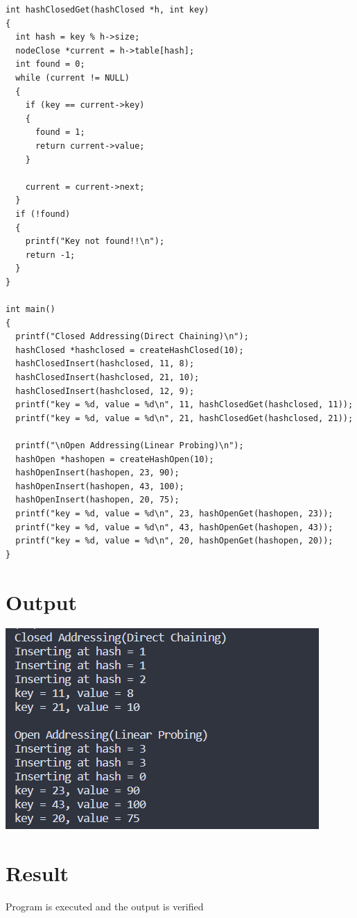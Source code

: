 \begin{lstlisting}[label={list:c_program:polynomial_operations}]
int hashClosedGet(hashClosed *h, int key)
{
  int hash = key % h->size;
  nodeClose *current = h->table[hash];
  int found = 0;
  while (current != NULL)
  {
    if (key == current->key)
    {
      found = 1;
      return current->value;
    }

    current = current->next;
  }
  if (!found)
  {
    printf("Key not found!!\n");
    return -1;
  }
}

int main()
{
  printf("Closed Addressing(Direct Chaining)\n");
  hashClosed *hashclosed = createHashClosed(10);
  hashClosedInsert(hashclosed, 11, 8);
  hashClosedInsert(hashclosed, 21, 10);
  hashClosedInsert(hashclosed, 12, 9);
  printf("key = %d, value = %d\n", 11, hashClosedGet(hashclosed, 11));
  printf("key = %d, value = %d\n", 21, hashClosedGet(hashclosed, 21));

  printf("\nOpen Addressing(Linear Probing)\n");
  hashOpen *hashopen = createHashOpen(10);
  hashOpenInsert(hashopen, 23, 90);
  hashOpenInsert(hashopen, 43, 100);
  hashOpenInsert(hashopen, 20, 75);
  printf("key = %d, value = %d\n", 23, hashOpenGet(hashopen, 23));
  printf("key = %d, value = %d\n", 43, hashOpenGet(hashopen, 43));
  printf("key = %d, value = %d\n", 20, hashOpenGet(hashopen, 20));
}
\end{lstlisting}

\section{Output}
\includegraphics[]{Cycle_2/Outputs/Hashing.png}

\section{Result}
Program is executed and the output is verified
